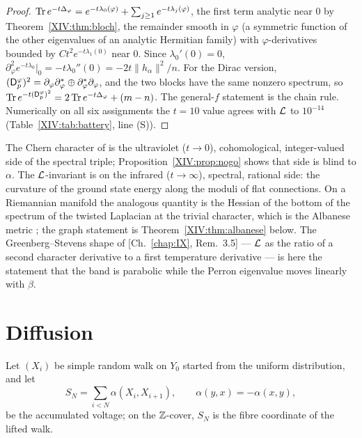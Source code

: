 \begin{proof}
$\operatorname{Tr} e^{-t\Delta_\varphi}=e^{-t\lambda_0(\varphi)}+\sum_{j\ge1}e^{-t\lambda_j(\varphi)}$, the
first term analytic near $0$ by Theorem~\ref{XIV:thm:bloch}, the remainder smooth in $\varphi$
(a symmetric function of the other eigenvalues of an analytic Hermitian family) with
$\varphi$-derivatives bounded by $Ct^{2}e^{-t\lambda_1(0)}$ near $0$. Since
$\lambda_0'(0)=0$, $\partial_\varphi^{2}e^{-t\lambda_0}|_0=-t\lambda_0''(0)=-2t\|h_\alpha\|^{2}/n$.
For the Dirac version,
$(\mathsf{D}_p^{\varphi})^{2}=\partial_\varphi\partial_\varphi^{*}\oplus\partial_\varphi^{*}\partial_\varphi$, and the two
blocks have the same nonzero spectrum, so $\operatorname{Tr} e^{-t(\mathsf{D}_p^{\varphi})^{2}}=2\operatorname{Tr} e^{-t\Delta_\varphi}+(m-n)$.
The general-$f$ statement is the chain rule. Numerically on all six assignments the
$t=10$ value agrees with $\mathcal{L}$ to $10^{-14}$ (Table~\ref{XIV:tab:battery}, line (S)).
\end{proof}

\begin{remark}[Reading]\label{XIV:rem:reading}
The Chern character of \cite{JLO,Co} is the ultraviolet ($t\to0$), cohomological, integer-valued
side of the spectral triple; Proposition~\ref{XIV:prop:nogo} shows that side is blind to
$\alpha$. The $\mathcal{L}$-invariant is on the infrared ($t\to\infty$), spectral, rational side:
the curvature of the ground state energy along the moduli of flat connections. On a
Riemannian manifold the analogous quantity is the Hessian of the bottom of the spectrum of
the twisted Laplacian at the trivial character, which is the Albanese metric
\cite{KS1}; the graph statement is Theorem~\ref{XIV:thm:albanese} below. The Greenberg--Stevens
shape of [Ch.~\ref{chap:IX}, Rem.~3.5] --- $\mathcal{L}$ as the ratio of a second character derivative to a first
temperature derivative --- is here the statement that the band is parabolic while the
Perron eigenvalue moves linearly with $\beta$.
\end{remark}

\section{Diffusion}\label{XIV:sec:diffusion}

Let $(X_i)$ be simple random walk on $Y_0$ started from the uniform distribution, and let
\[
S_N=\sum_{i<N}\alpha(X_i,X_{i+1}),\qquad \alpha(y,x)=-\alpha(x,y),
\]
be the accumulated voltage; on the $\mathbb{Z}$-cover, $S_N$ is the fibre coordinate of the lifted
walk.

